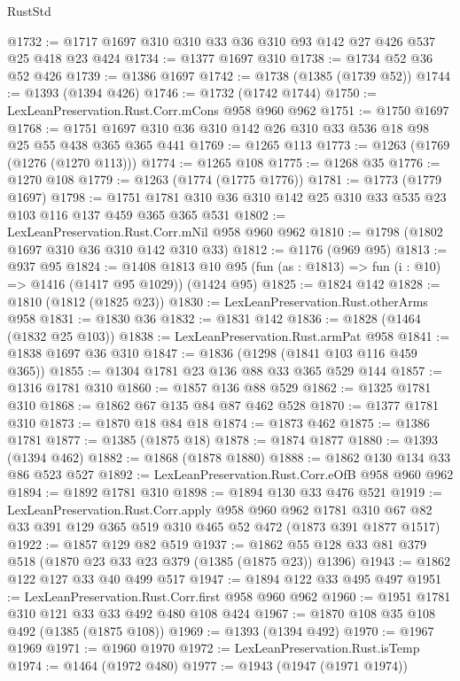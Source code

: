 \begin{lexlean}{RustStd}
\begin{coremodule}
@1732 := @1717 @1697 @310 @310 @33 @36 @310 @93 @142 @27 @426 @537 @25 @418 @23 @424
@1734 := @1377 @1697 @310
@1738 := @1734 @52 @36 @52 @426
@1739 := @1386 @1697
@1742 := @1738 (@1385 (@1739 @52))
@1744 := @1393 (@1394 @426)
@1746 := @1732 (@1742 @1744)
@1750 := LexLeanPreservation.Rust.Corr.mCons @958 @960 @962
@1751 := @1750 @1697
@1768 := @1751 @1697 @310 @36 @310 @142 @26 @310 @33 @536 @18 @98 @25 @55 @438 @365 @365 @441
@1769 := @1265 @113
@1773 := @1263 (@1769 (@1276 (@1270 @113)))
@1774 := @1265 @108
@1775 := @1268 @35
@1776 := @1270 @108
@1779 := @1263 (@1774 (@1775 @1776))
@1781 := @1773 (@1779 @1697)
@1798 := @1751 @1781 @310 @36 @310 @142 @25 @310 @33 @535 @23 @103 @116 @137 @459 @365 @365 @531
@1802 := LexLeanPreservation.Rust.Corr.mNil @958 @960 @962
@1810 := @1798 (@1802 @1697 @310 @36 @310 @142 @310 @33)
@1812 := @1176 (@969 @95)
@1813 := @937 @95
@1824 := @1408
    @1813
    @10
    @95
    (fun (as : @1813) => fun (i : @10) => @1416 (@1417 @95 @1029))
    (@1424 @95)
@1825 := @1824 @142
@1828 := @1810 (@1812 (@1825 @23))
@1830 := LexLeanPreservation.Rust.otherArms @958
@1831 := @1830 @36
@1832 := @1831 @142
@1836 := @1828 (@1464 (@1832 @25 @103))
@1838 := LexLeanPreservation.Rust.armPat @958
@1841 := @1838 @1697 @36 @310
@1847 := @1836 (@1298 (@1841 @103 @116 @459 @365))
@1855 := @1304 @1781 @23 @136 @88 @33 @365 @529 @144
@1857 := @1316 @1781 @310
@1860 := @1857 @136 @88 @529
@1862 := @1325 @1781 @310
@1868 := @1862 @67 @135 @84 @87 @462 @528
@1870 := @1377 @1781 @310
@1873 := @1870 @18 @84 @18
@1874 := @1873 @462
@1875 := @1386 @1781
@1877 := @1385 (@1875 @18)
@1878 := @1874 @1877
@1880 := @1393 (@1394 @462)
@1882 := @1868 (@1878 @1880)
@1888 := @1862 @130 @134 @33 @86 @523 @527
@1892 := LexLeanPreservation.Rust.Corr.eOfB @958 @960 @962
@1894 := @1892 @1781 @310
@1898 := @1894 @130 @33 @476 @521
@1919 := LexLeanPreservation.Rust.Corr.apply
    @958
    @960
    @962
    @1781
    @310
    @67
    @82
    @33
    @391
    @129
    @365
    @519
    @310
    @465
    @52
    @472
    (@1873 @391 @1877 @1517)
@1922 := @1857 @129 @82 @519
@1937 := @1862 @55 @128 @33 @81 @379 @518 (@1870 @23 @33 @23 @379 (@1385 (@1875 @23)) @1396)
@1943 := @1862 @122 @127 @33 @40 @499 @517
@1947 := @1894 @122 @33 @495 @497
@1951 := LexLeanPreservation.Rust.Corr.first @958 @960 @962
@1960 := @1951 @1781 @310 @121 @33 @33 @492 @480 @108 @424
@1967 := @1870 @108 @35 @108 @492 (@1385 (@1875 @108))
@1969 := @1393 (@1394 @492)
@1970 := @1967 @1969
@1971 := @1960 @1970
@1972 := LexLeanPreservation.Rust.isTemp
@1974 := @1464 (@1972 @480)
@1977 := @1943 (@1947 (@1971 @1974))

\end{coremodule}
\end{lexlean}
